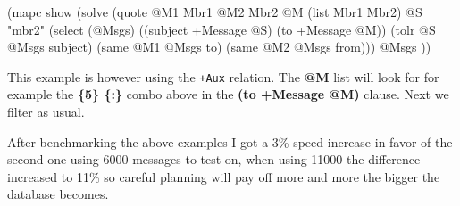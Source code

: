 \begin{wideverbatim}
(mapc show 
   (solve
      (quote
         @M1 Mbr1
         @M2 Mbr2
         @M (list Mbr1 Mbr2)
         @S "mbr2"
         (select (@Msgs)
            ((subject +Message @S) (to +Message @M))
            (tolr @S @Msgs subject)
            (same @M1 @Msgs to)
            (same @M2 @Msgs from))) 
      @Msgs ))
\end{wideverbatim}

This example is however using the \texttt{+Aux} relation. The
\textbf{@M} list will look for for example the \textbf{\{5\} \{:\}}
combo above in the \textbf{(to +Message @M)} clause. Next we filter as
usual.

After benchmarking the above examples I got a 3\% speed increase in favor
of the second one using 6000 messages to test on, when using 11000 the
difference increased to 11\% so careful planning will pay off more and
more the bigger the database becomes.
